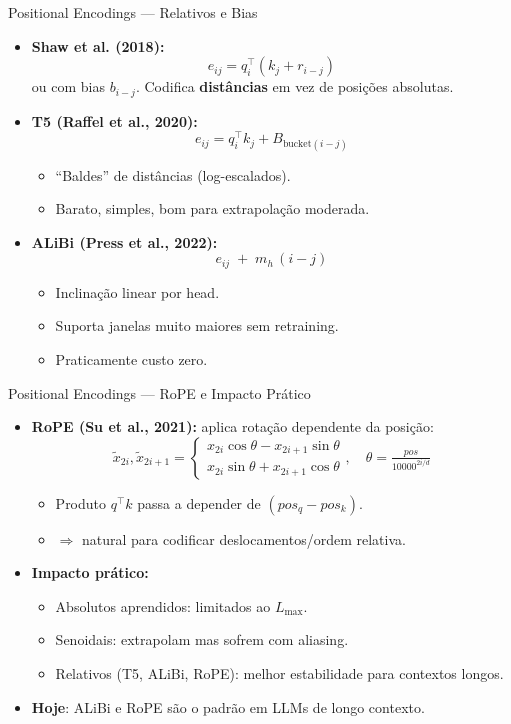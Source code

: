 \documentclass{beamer}
\begin{document}
\begin{frame}{Positional Encodings — Relativos e Bias}
\begin{itemize}
  \item \textbf{Shaw et al. (2018):}
  \[
  e_{ij}=q_i^\top(k_j + r_{i-j})
  \]
  ou com bias $b_{i-j}$. Codifica \textbf{distâncias} em vez de posições absolutas.

  \item \textbf{T5 (Raffel et al., 2020):}
  \[
  e_{ij}=q_i^\top k_j + B_{\text{bucket}(i-j)}
  \]
  \begin{itemize}
    \item “Baldes” de distâncias (log-escalados).
    \item Barato, simples, bom para extrapolação moderada.
  \end{itemize}

  \item \textbf{ALiBi (Press et al., 2022):}
  \[
  e_{ij} \;+\; m_h\,(i-j)
  \]
  \begin{itemize}
    \item Inclinação linear por head.
    \item Suporta janelas muito maiores sem retraining.
    \item Praticamente custo zero.
  \end{itemize}
\end{itemize}
\end{frame}
\begin{frame}{Positional Encodings — RoPE e Impacto Prático}
\begin{itemize}
  \item \textbf{RoPE (Su et al., 2021):} aplica rotação dependente da posição:
  \[
  \tilde{x}_{2i},\tilde{x}_{2i+1} =
  \begin{cases}
  x_{2i}\cos\theta - x_{2i+1}\sin\theta \\
  x_{2i}\sin\theta + x_{2i+1}\cos\theta
  \end{cases},\quad
  \theta=\tfrac{pos}{10000^{2i/d}}
  \]
  \begin{itemize}
    \item Produto $q^\top k$ passa a depender de $(pos_q - pos_k)$.
    \item $\Rightarrow$ natural para codificar deslocamentos/ordem relativa.
  \end{itemize}

  \item \textbf{Impacto prático:}
  \begin{itemize}
    \item Absolutos aprendidos: limitados ao $L_{\max}$.
    \item Senoidais: extrapolam mas sofrem com aliasing.
    \item Relativos (T5, ALiBi, RoPE): melhor estabilidade para contextos longos.
  \end{itemize}

  \item \textbf{Hoje}: ALiBi e RoPE são o padrão em LLMs de longo contexto.
\end{itemize}
\end{frame}
\end{document}
